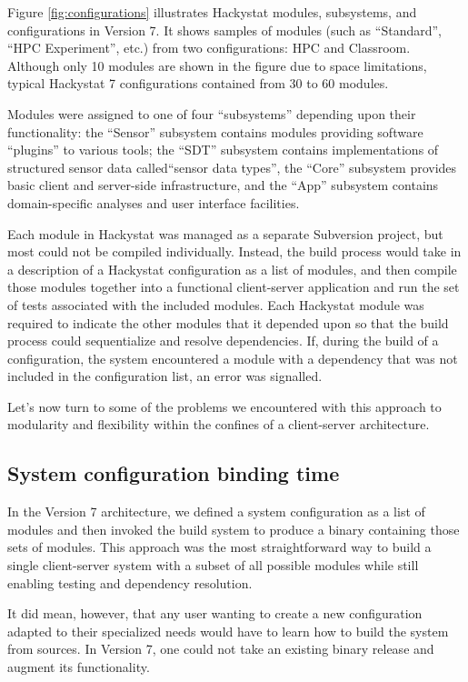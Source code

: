 \documentclass[conference,compsoc]{IEEEtran}
\begin{document}
Figure \ref{fig:configurations} illustrates Hackystat modules, subsystems,
and configurations in Version 7.  It shows samples of modules (such as
``Standard'', ``HPC Experiment'', etc.) from two configurations: HPC and
Classroom.  Although only 10 modules are shown in the figure due to space
limitations, typical Hackystat 7 configurations contained from 30 to 60
modules.


Modules were assigned to one of four ``subsystems'' depending upon their
functionality: the ``Sensor'' subsystem contains modules providing software
``plugins'' to various tools; the ``SDT'' subsystem contains
implementations of structured sensor data called``sensor data types'', the
``Core'' subsystem provides basic client and server-side infrastructure,
and the ``App'' subsystem contains domain-specific analyses and user
interface facilities.


Each module in Hackystat was managed as a separate Subversion project, but
most could not be compiled individually. Instead, the build process would
take in a description of a Hackystat configuration as a list of modules,
and then compile those modules together into a functional client-server
application and run the set of tests associated with the included modules.
Each Hackystat module was required to indicate the other modules that it
depended upon so that the build process could sequentialize and resolve
dependencies.  If, during the build of a configuration, the system
encountered a module with a dependency that was not included in the
configuration list, an error was signalled.

Let's now turn to some of the problems we encountered with this approach to
modularity and flexibility within the confines of a client-server
architecture.

\subsection{System configuration binding time}

In the Version 7 architecture, we defined a system configuration as a list
of modules and then invoked the build system to produce a binary containing
those sets of modules.  This approach was the most straightforward way to
build a single client-server system with a subset of all possible modules
while still enabling testing and dependency resolution.

It did mean, however, that any user wanting to create a new configuration
adapted to their specialized needs would have to learn how to build the
system from sources. In Version 7, one could not take an existing binary
release and augment its functionality.  
\end{document}
